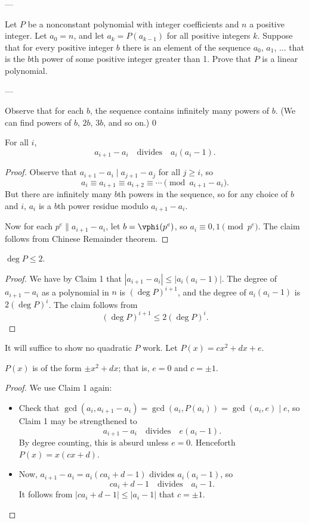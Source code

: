 
---

Let $P$ be a nonconstant polynomial with integer coefficients and $n$ a positive integer. Let $a_0=n$, and let $a_k=P(a_{k-1})$ for all positive integers $k$. Suppose that for every positive integer $b$ there is an element of the sequence $a_0$, $a_1$, $\ldots$ that is the $b$th power of some positive integer greater than 1. Prove that $P$ is a linear polynomial.

---

Observe that for each $b$, the sequence contains infinitely many powers of $b$. (We can find powers of $b$, $2b$, $3b$, and so on.)
\setcounter{claim}0
\begin{claim}
    For all $i$,
    \[a_{i+1}-a_i\quad\text{divides}\quad a_i(a_i-1).\]
\end{claim}
\begin{proof}
    Observe that $a_{i+1}-a_i\mid a_{j+1}-a_j$ for all $j\ge i$, so
    \[a_i\equiv a_{i+1}\equiv a_{i+2}\equiv\cdots\pmod{a_{i+1}-a_i}.\]
    But there are infinitely many $b$th powers in the sequence, so for any choice of $b$ and $i$, $a_i$ is a $b$th power residue modulo $a_{i+1}-a_i$.

    Now for each $p^e\parallel a_{i+1}-a_i$, let $b=\vphi(p^e)$, so $a_i\equiv 0,1\pmod{p^e}$. The claim follows from Chinese Remainder theorem.
\end{proof}
\begin{claim}
    $\deg P\le2$.
\end{claim}
\begin{proof}
    We have by Claim 1 that $|a_{i+1}-a_i|\le|a_i(a_i-1)|$. The degree of $a_{i+1}-a_i$ as a polynomial in $n$ is $(\deg P)^{i+1}$, and the degree of $a_i(a_i-1)$ is $2(\deg P)^i$. The claim follows from
    \[(\deg P)^{i+1}\le2(\deg P)^i.\]
\end{proof}

It will suffice to show no quadratic $P$ work. Let $P(x)=cx^2+dx+e$.
\begin{claim}
    $P(x)$ is of the form $\pm x^2+dx$; that is, $e=0$ and $c=\pm1$.
\end{claim}
\begin{proof}
    We use Claim 1 again:
    \begin{itemize}
        \item Check that $\gcd(a_i,a_{i+1}-a_i)=\gcd(a_i,P(a_i))=\gcd(a_i,e)\mid e$, so Claim 1 may be strengthened to
            \[a_{i+1}-a_i\quad\text{divides}\quad e(a_i-1).\]
            By degree counting, this is absurd unless $e=0$. Henceforth $P(x)=x(cx+d)$.
        \item Now, $a_{i+1}-a_i=a_i(ca_i+d-1)$ divides $a_i(a_i-1)$, so
            \[ca_i+d-1\quad\text{divides}\quad a_i-1.\]
            It follows from $|ca_i+d-1|\le|a_i-1|$ that $c=\pm1$.
    \end{itemize}
\end{proof}


